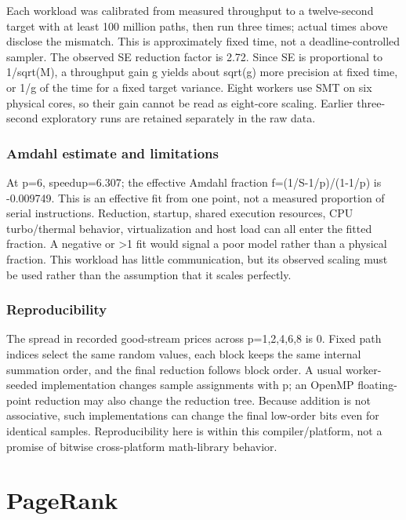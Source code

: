 \documentclass[11pt,a4paper]{article}
\begin{document}
Each workload was calibrated from measured throughput to a twelve-second target with at least 100 million paths, then run three times; actual times above disclose the mismatch. This is approximately fixed time, not a deadline-controlled sampler. The observed SE reduction factor is 2.72. Since SE is proportional to 1/\allowbreak{}sqrt(M), a throughput gain g yields about sqrt(g) more precision at fixed time, or 1/\allowbreak{}g of the time for a fixed target variance. Eight workers use SMT on six physical cores, so their gain cannot be read as eight-core scaling. Earlier three-second exploratory runs are retained separately in the raw data.


\subsubsection*{Amdahl estimate and limitations}

At p=\allowbreak{}6, speedup=\allowbreak{}6.307; the effective Amdahl fraction f=\allowbreak{}(1/\allowbreak{}S-1/\allowbreak{}p)/\allowbreak{}(1-1/\allowbreak{}p) is -0.009749. This is an effective fit from one point, not a measured proportion of serial instructions. Reduction, startup, shared execution resources, CPU turbo/\allowbreak{}thermal behavior, virtualization and host load can all enter the fitted fraction. A negative or >1 fit would signal a poor model rather than a physical fraction. This workload has little communication, but its observed scaling must be used rather than the assumption that it scales perfectly.


\subsubsection*{Reproducibility}

The spread in recorded good-stream prices across p=\allowbreak{}1,2,4,6,8 is 0. Fixed path indices select the same random values, each block keeps the same internal summation order, and the final reduction follows block order. A usual worker-seeded implementation changes sample assignments with p; an OpenMP floating-point reduction may also change the reduction tree. Because addition is not associative, such implementations can change the final low-order bits even for identical samples. Reproducibility here is within this compiler/\allowbreak{}platform, not a promise of bitwise cross-platform math-library behavior.


\FloatBarrier

\section{PageRank}
\end{document}

